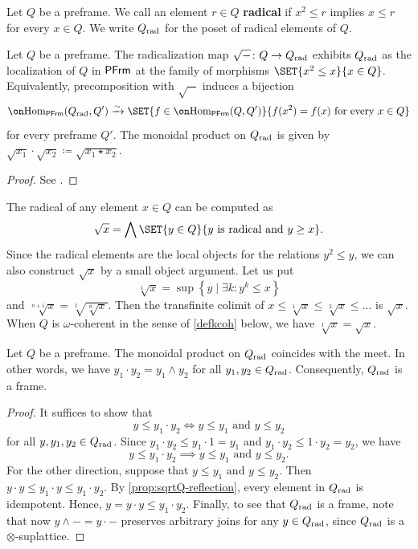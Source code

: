 \documentclass[10pt,a4paper,oneside]{article}
\begin{document}
\begin{de}\label{def:rad}
Let $Q$ be a preframe. We call an element $r \in Q$ \textbf{radical} if $x^2 \le r$ implies $x \le r$ for every $x \in Q$. We write $Q_{\operatorname{rad}}$ for the poset of radical elements of $Q$. 
\end{de}

\begin{prop}\label{prop:sqrtQ-reflection}
Let $Q$ be a preframe. The radicalization map $\sqrt{-}\colon Q \to Q_{\operatorname{rad}}$ exhibits $Q_{\operatorname{rad}}$ as the localization of $Q$ in $\mathsf{PFrm}$ at the family of morphisms $\SET{x^2\le x}{x\in Q}$. Equivalently, precomposition with $\sqrt{-}$ induces a bijection
\[
\Hom_{\pfrm}(Q_{\op{rad}},Q') \xrightarrow{\sim} \SET{f\in\Hom_{\pfrm}(Q,Q')}{f(x^2)=f(x)\text{ for every }x\in Q}
\]
for every preframe $Q'$. The monoidal product on $Q_{\operatorname{rad}}$ is given by $\sqrt{x_1} \cdot \sqrt{x_2} \coloneq \sqrt{x_1 \star x_2}$.
\end{prop}

\begin{proof}
See \cite[Proposition~A.4.3 and Proposition~A.2.1]{anel2023left}.
\end{proof}

\begin{rem}\label{operationsqrt}
The radical of any element $x \in Q$ can be computed as
\[
\sqrt x = \bigwedge\SET{y\in Q}{y\text{ is radical and }y\ge x}.
\]
Since the radical elements are the local objects for the relations $y^2 \leq y$, we can also construct $\sqrt{x}$ by a small object argument. Let us put
$$
\sqrt[1]{x}=\sup \left\{y \mid \exists k\colon y^k \leq x\right\}
$$
and $\sqrt[n+1]{x}=\sqrt[1]{\sqrt[n]{x}}$. Then the transfinite colimit of $x \leq \sqrt[1]{x} \leq \sqrt[2]{x} \leq \ldots$ is $\sqrt{x}$. When $Q$ is $\omega$-coherent in the sense of \cref{defkcoh} below, we have $\sqrt[1]{x}=\sqrt{x}$.
\end{rem}

\begin{thm}\label{thm:sqrtQ-frame}
Let $Q$ be a preframe. The monoidal product on $Q_{\operatorname{rad}}$ coincides with the meet. In other words, we have $y_1 \cdot y_2 = y_1 \wedge y_2$ for all $y_1, y_2 \in Q_{\operatorname{rad}}$. Consequently, $Q_{\operatorname{rad}}$ is a frame.
\end{thm}

\begin{proof}
It suffices to show that
\[
y \le y_1\cdot y_2 \iff y\le y_1 \text{ and } y\le y_2
\]
for all $y, y_1, y_2 \in Q_{\operatorname{rad}}$.
Since $y_1\cdot y_2 \le y_1\cdot 1 = y_1$ and $y_1\cdot y_2 \le 1\cdot y_2=y_2$, we have
\[
y \le y_1\cdot y_2 \implies y\le y_1 \text{ and } y\le y_2.
\]
For the other direction, suppose that $y\le y_1 \text{ and } y\le y_2$. Then $y\cdot y \le y_1\cdot y \le y_1\cdot y_2$. By \cref{prop:sqrtQ-reflection}, every element in $Q_{\operatorname{rad}}$ is idempotent. Hence, $y = y\cdot y \le y_1\cdot y_2$. Finally, to see that $Q_{\operatorname{rad}}$ is a frame, note that now $y\wedge-=y\cdot-$ preserves arbitrary joins for any $y\in Q_{\operatorname{rad}}$, since $Q_{\operatorname{rad}}$ is a $\otimes$-suplattice.
\end{proof}
\end{document}
